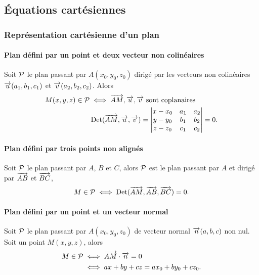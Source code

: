 \subsection{Équations cartésiennes}

\subsubsection{Représentation cartésienne d'un plan}

\paragraph{Plan défini par un point et deux vecteur non colinéaires}

Soit \(\P\) le plan passant par \(A(x_0, y_0, z_0)\) dirigé par les vecteurs non 
colinéaires \(\vu(a_1, b_1, c_1)\) et \(\vv(a_2, b_2, c_2)\). Alors
\begin{align}
  M(x, y, z) \in \P &\iff \vect{AM}, \vu, \vv \text{~sont coplanaires}\\
                    &\Det(\vect{AM},\vu, \vv) = \begin{vmatrix} x - x_0 & a_1 & 
                      a_2 \\ y - y_0 & b_1 & b_2 \\ z - z_0 & c_1 & 
                    c_2\end{vmatrix}=0.
\end{align}

\paragraph{Plan défini par trois points non alignés}

Soit \(\P\) le plan passant par \(A\), \(B\) et \(C\), alors \(\P\) est le plan 
passant par \(A\) et dirigé par \(\vect{AB}\) et \(\vect{BC}\),
\begin{equation}
  M \in \P \iff \Det(\vect{AM},\vect{AB},\vect{BC})=0.
\end{equation}

\paragraph{Plan défini par un point et un vecteur normal}

Soit \(\P\) le plan passant par \(A(x_0, y_0, z_0)\) de vecteur normal 
\(\vect{n}(a, b, c)\) non nul. Soit un point \(M(x, y, z)\), alors
\begin{align}
  M \in \P &\iff \vect{AM}\cdot\vect{n} = 0 \\
           &\iff ax + by + cz = ax_0 + by_0 + cz_0.
\end{align}


